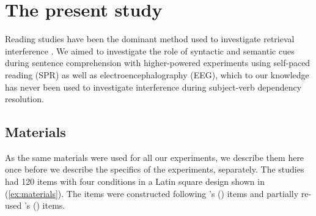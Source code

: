 \documentclass[a4paper, man, floatsintext]{apa7}
\begin{document}
\section{The present study}

Reading studies have been the dominant method used to investigate retrieval interference \parencite[see the review in][]{jaeger_etal_2017}. We aimed to investigate the role of syntactic and semantic cues during sentence comprehension with higher-powered experiments using  self-paced reading (SPR) as well as electroencephalography (EEG), which to our knowledge has never been used to investigate interference during subject-verb dependency resolution.

 \label{vd_design}

\subsection{Materials}

As the same materials were used for all our experiments, we describe them here once before we describe the specifics of the experiments, separately. The studies had 120 items with four conditions in a Latin square design shown in (\ref{ex:materials}). The items were constructed following \citeauthor{vandyke07}'s (\citeyear{vandyke07}) items and partially re-used  \citeauthor{mertzen}'s (\citeyear{mertzen}) items.
\end{document}
